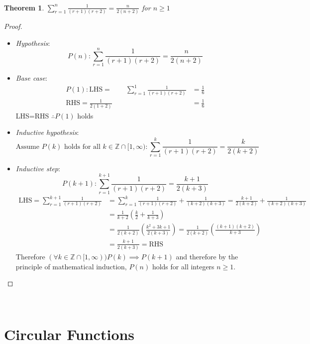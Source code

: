 \documentclass[a4paper,twoside,10pt]{article}
\newenvironment{examquestion}[1]{%
	\mbox{}\\\tcolorbox[beamer,breakable,%
	title=Exam-style Question: #1,standard jigsaw,opacityback=0, colframe=red!75!black, boxrule=2pt]}{\endtcolorbox\mbox{}\\}
\newtheorem*{theorem*}{Theorem}
\begin{document}
			\begin{examquestion}{1000 Spesh Questions Doc Induction Proof 11}
				\begin{theorem*}
					$\displaystyle\sum_{r=1}^{n}\frac{1}{(r+1)(r+2)}=\frac{n}{2(n+2)}$ for $n\geq1$
				\end{theorem*}
				\begin{proof}
					\begin{itemize}[label=$\lozenge$, itemsep=4ex]
						\item \emph{Hypothesis}:
						\[
						P(n): \sum_{r=1}^{n}\frac{1}{(r+1)(r+2)}=\frac{n}{2(n+2)}
						\]
						\item \emph{Base case}:
						\begin{align*}
							P(1):\mathrm{LHS}=\qquad\sum_{r=1}^{1}\frac{1}{(r+1)(r+2)}&=\frac{1}{6}\\
							\mathrm{RHS}=\frac{1}{2(1+2)}&=\frac{1}{6}
						\end{align*}
						LHS=RHS $\therefore P(1)$ holds
						\item \emph{Inductive hypothesis}:
						\[
							\text{Assume }P(k)\text{ holds for all }k\in\mathbb{Z}\cap[1,\infty): \sum_{r=1}^{k}\frac{1}{(r+1)(r+2)}=\frac{k}{2(k+2)}
						\]
						\item \emph{Inductive step}:
						\[
							P(k+1): \sum_{r=1}^{k+1}\frac{1}{(r+1)(r+2)}=\frac{k+1}{2(k+3)}
						\]
						\begin{align*}
							\text{LHS}=\sum_{r=1}^{k+1}\frac{1}{(r+1)(r+2)}&=\sum_{r=1}^{k}\frac{1}{(r+1)(r+2)}+\frac{1}{(k+2)(k+3)}=\frac{k+1}{2(k+2)}+\frac{1}{(k+2)(k+3)}\\
							&=\frac{1}{k+2}\left(\frac{k}{2}+\frac{1}{k+3}\right)\\
							&=\frac{1}{2(k+2)}\left(\frac{k^2+3k+1}{2(k+3)}\right)=\frac{1}{2(k+2)}\left(\frac{(k+1)(k+2)}{k+3}\right)\\
							&=\frac{k+1}{2(k+3)}=\text{RHS}
						\end{align*}
						Therefore $(\forall k\in\mathbb{Z}\cap[1,\infty))P(k)\implies P(k+1)$ and therefore by the principle of mathematical induction, $P(n)$ holds for all integers $n\geq1$.
					\end{itemize}
				\end{proof}
			\end{examquestion}
			
	\section{Circular Functions}
\end{document}
